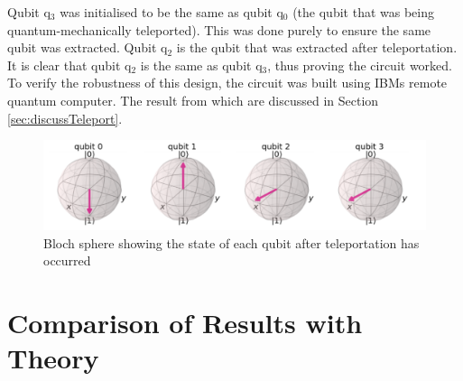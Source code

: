 Qubit q$_3$ was initialised to be the same as qubit q$_0$ (the qubit that was being quantum-mechanically teleported). This was done purely to ensure the same qubit was extracted. Qubit q$_2$ is the qubit that was extracted after teleportation. It is clear that qubit q$_2$ is the same as qubit q$_3$, thus proving the circuit worked. To verify the robustness of this design, the circuit was built using IBMs remote quantum computer. The result from which are discussed in Section \ref{sec:discussTeleport}.

\begin{figure}[h]
    \centering
    \includegraphics[width=\textwidth]{lab3/images/teleportBloch.png}
    \captionsetup{font = it, labelfont = bf, width=.91\linewidth, justification=centering}
    \caption{Bloch sphere showing the state of each qubit after teleportation has occurred}
    \label{fig:teleportBloch}
\end{figure}

\section{Comparison of Results with Theory}

